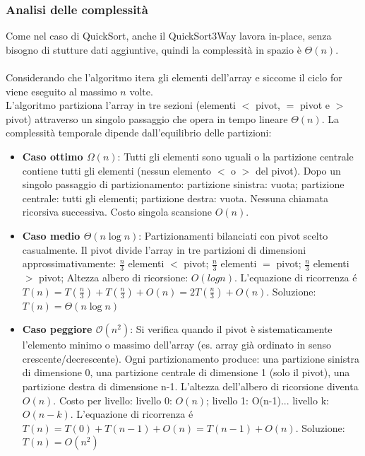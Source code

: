 \documentclass[a4paper, 11pt]{article}
\begin{document}
\subsubsection{Analisi delle complessità}
Come nel caso di QuickSort, anche il QuickSort3Way lavora in-place, senza bisogno di stutture dati aggiuntive, quindi la complessità in spazio è $\Theta(n)$.\\\\
Considerando che l'algoritmo itera gli elementi dell'array e siccome il ciclo for viene eseguito al massimo $n$ volte.\\
L'algoritmo partiziona l'array in tre sezioni (elementi $<$ pivot, $=$ pivot e $>$ pivot) attraverso un singolo passaggio che opera in tempo lineare $\Theta(n)$. La complessità temporale dipende dall'equilibrio delle partizioni:
\begin{itemize}
    \item \textbf{Caso ottimo $\Omega(n)$}: Tutti gli elementi sono uguali o la partizione centrale contiene tutti gli elementi (nessun elemento $<$ o $>$ del pivot). Dopo un singolo passaggio di partizionamento: partizione sinistra: vuota; partizione centrale: tutti gli elementi; partizione destra: vuota. Nessuna chiamata ricorsiva successiva. Costo singola scansione $O(n)$.
    \item \textbf{Caso medio $\Theta(n \log n)$}: Partizionamenti bilanciati con pivot scelto casualmente. Il pivot divide l'array in tre partizioni di dimensioni approssimativamente: $\frac{n}{3}$ elementi $<$ pivot; $\frac{n}{3}$ elementi $=$ pivot; $\frac{n}{3}$ elementi $>$ pivot; Altezza albero di ricorsione: $O(log n)$. L'equazione di ricorrenza é $T(n) = T\left(\frac{n}{3}\right) + T\left(\frac{n}{3}\right) + O(n) = 2T\left(\frac{n}{3}\right) + O(n)$. Soluzione: $T(n) = \Theta(n \log n)$
    \item \textbf{Caso peggiore $\mathcal{O}(n^2)$}: Si verifica quando il pivot è sistematicamente l'elemento minimo o massimo dell'array (es. array già ordinato in senso crescente/decrescente). Ogni partizionamento produce: una partizione sinistra di dimensione 0, una partizione centrale di dimensione 1 (solo il pivot), una partizione destra di dimensione n-1. L'altezza dell'albero di ricorsione diventa $O(n)$. Costo per livello: livello 0: $O(n)$; livello 1: O(n-1)... livello k: $O(n-k)$. L'equazione di ricorrenza é $T(n) = T(0) + T(n-1) + O(n) = T(n-1) + O(n)$. Soluzione: $T(n) = O(n^2)$
\end{itemize}
\end{document}
